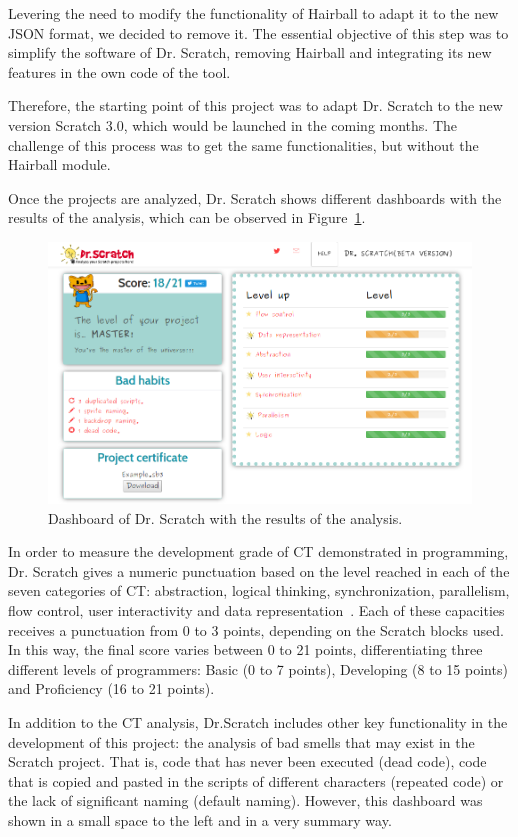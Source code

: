 Levering the need to modify the functionality of Hairball to adapt it to the new JSON format, we decided to remove it. The essential objective of this step was to simplify the software of Dr. Scratch, removing Hairball and integrating its new features in the own code of the tool. 

Therefore, the starting point of this project was to adapt Dr. Scratch to the new version Scratch 3.0, which would be launched in the coming months. The challenge of this process was to get the same functionalities, but without the Hairball module.

\hfill

Once the projects are analyzed, Dr. Scratch shows different dashboards with the results of the analysis, which can be observed in Figure~\ref{fig:dashboards}.

\begin{figure}
  \centering
  \includegraphics[width=12cm, keepaspectratio]{img/dashboards.png}
  \caption{Dashboard of Dr. Scratch with the results of the analysis.}
  \label{fig:dashboards}
\end{figure}

In order to measure the development grade of CT demonstrated in programming, Dr. Scratch gives a numeric punctuation based on the level reached in each of the seven categories of CT: abstraction, logical thinking, synchronization, parallelism, flow control, user interactivity and data representation~\cite{moreno2015dr}. Each of these capacities receives a punctuation from 0 to 3 points, depending on the Scratch blocks used. In this way, the final score varies between 0 to 21 points, differentiating three different levels of programmers: Basic (0 to 7 points), Developing (8 to 15 points) and Proficiency (16 to 21 points).   

In addition to the CT analysis, Dr.Scratch includes other key functionality in the development of this project: the analysis of bad smells that may exist in the Scratch project. That is, code that has never been executed (dead code), code that is copied and pasted in the scripts of different characters (repeated code) or the lack of significant naming (default naming). However, this dashboard was shown in a small space to the left and in a very summary way.


